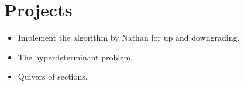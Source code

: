 \documentclass[a4paper]{article}
\begin{document}
\section{Projects}
\begin{itemize}
\item Implement the algorithm by Nathan for up and downgrading.
\item The hyperdeterminant problem.
\item Quivers of sections.
\end{itemize}
\end{document}
